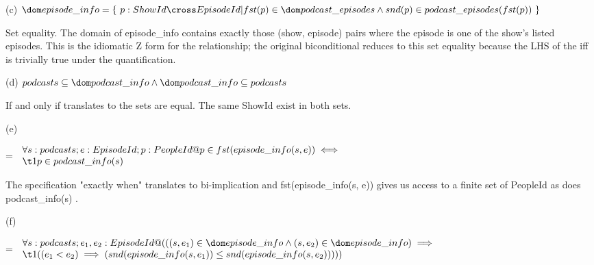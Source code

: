 \documentclass[a4paper,10pt,fleqn]{article}
\begin{document}
\noindent\hspace*{\parindent}(c) $\dom episode\_info = \{~ p : ShowId \cross EpisodeId | fst(p) \in \dom podcast\_episodes \land snd(p) \in podcast\_episodes(fst(p)) ~\}$

\bigskip

\setlength{\leftskip}{\dimexpr\parindent+2em\relax}
\noindent Set equality. The domain of episode\_info contains exactly those (show, episode) pairs where the episode is one of the show's listed episodes. This is the idiomatic Z form for the relationship; the original biconditional reduces to this set equality because the LHS of the iff is trivially true under the quantification.

\bigskip

\newpage

\setlength{\leftskip}{0pt}
\medskip

\noindent\hspace*{\parindent}(d) $podcasts \subseteq \dom podcast\_info \land \dom podcast\_info \subseteq podcasts$

\bigskip

\setlength{\leftskip}{\dimexpr\parindent+2em\relax}
\noindent If and only if translates to the sets are equal. The same ShowId exist in both sets.

\bigskip

\setlength{\leftskip}{0pt}
\medskip

\noindent\hspace*{\parindent}(e)

\setlength{\leftskip}{\dimexpr\parindent+2em\relax}
\savedleftskip=\leftskip
\noindent
$\displaystyle
\begin{array}{l}
\forall s : podcasts; e : EpisodeId; p : PeopleId @ p \in fst(episode\_info(s, e)) \iff \\
\t1 p \in podcast\_info(s)
\end{array}$

\bigskip


\bigskip

\setlength{\leftskip}{\dimexpr\parindent+2em\relax}
\noindent The specification "exactly when" translates to bi-implication and fst(episode\_info(s, e)) gives us access to a finite set of PeopleId as does podcast\_info(s) .

\bigskip

\setlength{\leftskip}{0pt}
\medskip

\noindent\hspace*{\parindent}(f)

\setlength{\leftskip}{\dimexpr\parindent+2em\relax}
\savedleftskip=\leftskip
\noindent
$\displaystyle
\begin{array}{l}
\forall s : podcasts; e_1, e_2 : EpisodeId @ (((s, e_1) \in \dom episode\_info \land (s, e_2) \in \dom episode\_info) \implies \\
\t1 ((e_1 < e_2) \implies (snd(episode\_info(s, e_1)) \leq snd(episode\_info(s, e_2)))))
\end{array}$
\end{document}
